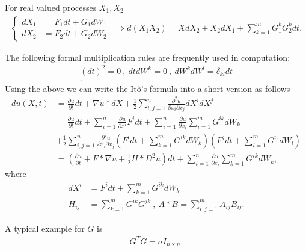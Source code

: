 \begin{prop}
  For real valued processes $X_{1},X_{2}$
 \begin{align*}
  \begin{cases}
    dX_{1} &= F_{1} dt + G_1 dW_1 \\
    d X_2 &= F_{2} dt + G_{2} dW_2
  \end{cases} \implies d(X_{1}X_{2}) = XdX_{2} + X_{2}dX_{1} + \sum_{k=1}^{m} G_1^{k} G_2^{k} dt   
 .\end{align*} 
\end{prop}
\begin{remark}
 The following formal multiplication rules are frequently used in computation:
 \begin{align*}
   (dt)^2 = 0 \ , \ dt dW^{k} = 0 \ , \ dW^{k}dW^{l} = \delta_{kl} dt \\
 .\end{align*}
  Using the above we can write the It\^o's formula into a short version as follows 
\begin{align*}
  du(X,t) &= \frac{\partial u}{\partial t} dt + \nabla u*dX + \frac{1}{2}\sum_{i,j=1}^{n} \frac{\partial ^2  u}{\partial x_i \partial x_j}   dX^{i}dX^{j}   \\ 
          &= \frac{\partial u}{\partial t} dt + \sum_{i=1}^{n} \frac{\partial u}{\partial x^{i} } F^{i} dt + \sum_{i=1}^{n} \frac{\partial u }{\partial x_i}      \sum_{i=1}^{m} G^{ik} d W_k   \\
          &+  \frac{1}{2} \sum_{i,j=1}^{n}  \frac{\partial ^2  u}{\partial x_i \partial x_j} \left(F^{i} dt + \sum_{k=1}^{m} G^{ik} dW_k   \right)\left( F^{j} dt + \sum_{l=1}^{m} G^{i;} dW_l    \right)   \\
          &= (\frac{\partial u}{\partial t} + F*\nabla u + \frac{1}{2} H*D^2 u) dt + \sum_{i=1}^{n} \frac{\partial u}{\partial x_i} \sum_{k=1}^{m} G^{ik} dW_{k}
,\end{align*}
where 
\begin{align*}
  dX^{i} &= F^{i} dt + \sum_{k=1}^{m}  G^{ik} dW_k   \\
  H_{ij} &= \sum_{k=1}^{m} G^{ik}G^{jk}  \ , \ A *B = \sum_{i,j=1}^{m} A_{ij} B_{ij} 
.\end{align*}
\end{remark}
\begin{example}
 A typical example for $G$ is  
  \begin{align*}
      G^{T}G = \sigma  I_{n \times  n} 
  .\end{align*}
\end{example}
